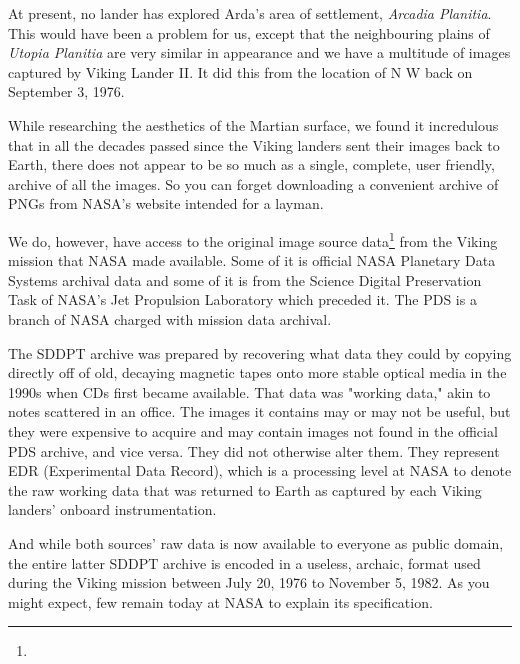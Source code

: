At present, no lander has explored Arda's area of settlement, {\it Arcadia Planitia}. This would have been a problem for us, except that the neighbouring plains of {\it Utopia Planitia} are very similar in appearance and we have a multitude of images captured by Viking Lander II. It did this from the location of N W back on September 3, 1976.

    {}


While researching the aesthetics of the Martian surface, we found it incredulous that in all the decades passed since the Viking landers sent their images back to Earth, there does not appear to be so much as a single, complete, user friendly, archive of all the images. So you can forget downloading a convenient archive of PNGs from NASA's website intended for a layman.

We do, however, have access to the original image source data\footnote{} from the Viking mission that NASA made available. Some of it is official NASA Planetary Data Systems archival data and some of it is from the Science Digital Preservation Task of NASA's Jet Propulsion Laboratory which preceded it. The PDS is a branch of NASA charged with mission data archival.

The SDDPT archive was prepared by recovering what data they could by copying directly off of old, decaying magnetic tapes onto more stable optical media in the 1990s when CDs first became available. That data was "working data," akin to notes scattered in an office. The images it contains may or may not be useful, but they were expensive to acquire and may contain images not found in the official PDS archive, and vice versa. They did not otherwise alter them. They represent EDR (Experimental Data Record), which is a processing level at NASA to denote the raw working data that was returned to Earth as captured by each Viking landers' onboard instrumentation.

And while both sources' raw data is now available to everyone as public domain, the entire latter SDDPT archive is encoded in a useless, archaic, format used during the Viking mission between July 20, 1976 to November 5, 1982. As you might expect, few remain today at NASA to explain its specification.

